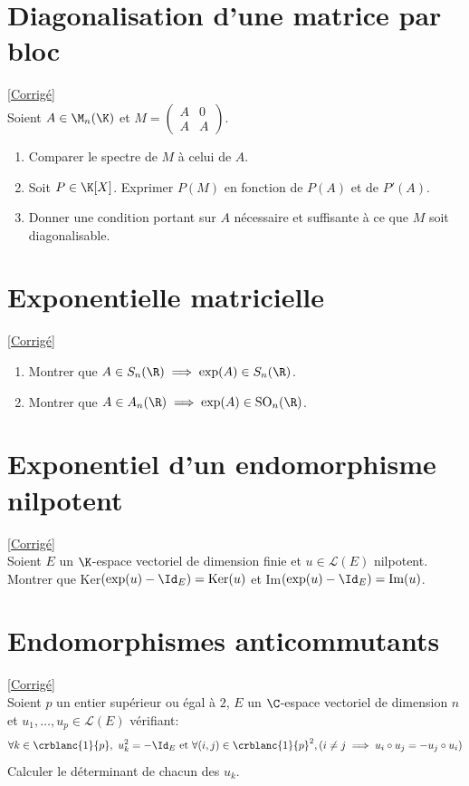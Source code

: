 \documentclass[8pt]{book}
\begin{document}
	\section{Diagonalisation d'une matrice par bloc }
	\label{Diagonalisation d'une matrice par bloc}
	\textcolor{blue}{\hyperref[Diagonalisation d'une matrice par bloc corrigé]{[Corrigé]}}\\
	Soient $A\in \M_n(\K)$ et
	$M=\left(\begin{array}{c|c}
		A&0  \\
		\hline
		A&A
	\end{array}\right)$.
	\begin{enumerate}
		\item Comparer le spectre de $M$ à celui de $A$.
		\item Soit $P\in \K[X]$. Exprimer $P(M)$ en fonction de $P(A)$ et de $P'(A)$.
		\item Donner une condition portant sur $A$ nécessaire et suffisante à ce que $M$ soit diagonalisable.
	\end{enumerate}
	
	\section{Exponentielle matricielle }
	\label{Exponentielle matricielle}
	\textcolor{blue}{\hyperref[Exponentielle matricielle corrigé]{[Corrigé]}}\\
	\begin{enumerate}[leftmargin=*]
		\item Montrer que $A\in S_n(\R)\implies \exp(A)\in S_n(\R)$.
		\item Montrer que $A\in A_n(\R)\implies \exp(A)\in \text{SO}_n(\R)$.
	\end{enumerate}
	
	\section{Exponentiel d'un endomorphisme nilpotent }
	\textcolor{blue}{\hyperref[Exponentiel d'un endomorphisme nilpotent corrigé]{[Corrigé]}}\\
	\label{Exponentiel d'un endomorphisme nilpotent}
	Soient $E$ un $\K$-espace vectoriel de dimension finie et $u\in \mathcal{L}(E)$ nilpotent.\\
	Montrer que Ker$(\exp(u)-\Id_E)=\text{Ker}(u)$ et Im$(\exp(u)-\Id_E)=\text{Im}(u)$.
	
	\section{Endomorphismes anticommutants }
	\label{Endomorphismes anticommutants}
	\textcolor{blue}{\hyperref[Endomorphimes anticommutants corrigé]{[Corrigé]}}\\
	Soient $p$ un entier supérieur ou égal à $2$, $E$ un $\C$-espace vectoriel de dimension $n$ et $u_1,\dots,u_p\in \mathcal{L}(E)$ vérifiant:
	$$\forall k\in \crblanc{1}{p},\ u^2_k=-\Id_E\text{ et } \forall (i,j)\in \crblanc{1}{p}^2,(i\ne j\implies u_i\circ u_j=-u_j\circ u_i)$$
	Calculer le déterminant de chacun des $u_k$.
	
\end{document}
